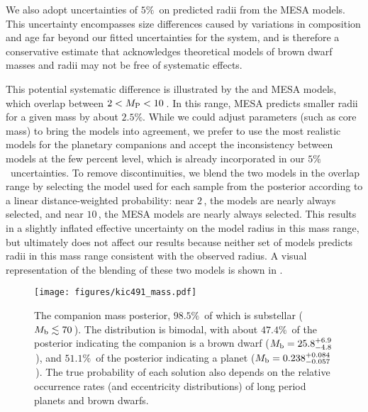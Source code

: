 \documentclass[twocolumn]{aastex63}
\begin{document}
We also adopt uncertainties of $5\%$\ on predicted radii from the MESA models. This uncertainty encompasses size differences caused by variations in composition and age far beyond our fitted uncertainties for the system, and is therefore a conservative estimate that acknowledges theoretical models of brown dwarf masses and radii may not be free of systematic effects. 

This potential systematic difference is illustrated by the   and MESA models, which overlap between $2 < \mpl < 10$\,\mjup. In this range, MESA predicts smaller radii for a given mass by about $2.5\%$. While we could adjust parameters (such as  core mass) to bring the models into agreement, we prefer to use the most realistic  models for the planetary companions and accept the inconsistency between models at the few percent level, which is already incorporated in our $5\%$\ uncertainties. To remove discontinuities, we blend the two models in the overlap range by selecting the model used for each sample from the posterior according to a linear distance-weighted probability: near $2$\,\mjup, the  models are nearly always selected, and near $10$\,\mjup, the MESA models are nearly always selected. This results in a slightly inflated effective uncertainty on the model radius in this mass range, but ultimately does not affect our results because neither set of models predicts radii in this mass range consistent with the observed radius. A visual representation of the blending of these two models is shown in .

\begin{figure}[!t]
    \centering
    \texttt{[image: figures/kic491\_mass.pdf]}
    \caption{The companion mass posterior, $98.5\%$\ of which is substellar ($\mb \lesssim 70$\,\mjup). The distribution is bimodal, with about $47.4\%$\ of the posterior indicating the companion is a brown dwarf ($\mb = 25.8^{+6.9}_{-4.8}$\,\mjup), and $51.1\%$\ of the posterior indicating a planet ($\mb = 0.238^{+0.084}_{-0.057}$\,\mjup). The true probability of each solution also depends on the relative occurrence rates (and eccentricity distributions) of long period planets and brown dwarfs.}
    \label{fig:mass}
\end{figure}
\end{document}
